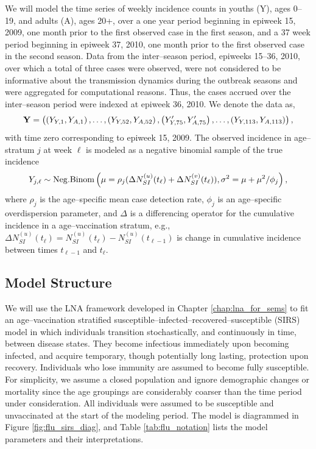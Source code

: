 We will model the time series of weekly incidence counts in youths (Y), ages 0--19, and adults (A), ages 20+, over a one year period beginning in epiweek 15, 2009, one month prior to the first observed case in the first season, and a 37 week period beginning in epiweek 37, 2010, one month prior to the first observed case in the second season. Data from the inter--season period, epiweeks 15--36, 2010, over which a total of three cases were observed, were not considered to be informative about the transmission dynamics during the outbreak seasons and were aggregated for computational reasons. Thus, the cases accrued over the inter--season period were indexed at epiweek 36, 2010. We denote the data as, $$ \mathbf{Y} = \left (\left (Y_{Y,1},Y_{A,1}\right ),\dots,\left (Y_{Y,52},Y_{A,52}\right ),\left (Y^\prime_{Y,75},Y^\prime_{A,75}\right ),\dots,\left (Y_{Y,113},Y_{A,113}\right )\right ), $$ with time zero corresponding to epiweek 15, 2009. The observed incidence in age--stratum $ j $ at week $ \ell $ is modeled as a negative binomial sample of the true incidence \begin{equation}
\label{flu_emit_prob}
Y_{j,\ell} \sim \mathrm{Neg.Binom}\left (\mu = \rho_j(\Delta N_{SI}^{(u)}(t_\ell) + \Delta N_{SI}^{(v)}(t_\ell)), \sigma^2 = \mu + \mu^2 / \phi_j\right ),
\end{equation}
where $ \rho_j $ is the age--specific mean case detection rate, $ \phi_j $ is an age--specific overdispersion parameter, and $ \Delta $ is a differencing operator for the cumulative incidence in a age--vaccination stratum, e.g., $ \Delta N_{SI}^{(u)}(t_\ell) = N_{SI}^{(u)}(t_\ell) - N_{SI}^{(u)}(t_{\ell-1}) $ is change in cumulative incidence between times $ t_{\ell-1} $ and $ t_\ell $.

\subsection{Model Structure}
\label{subsec:flu_modstructure}

We will use the LNA framework developed in Chapter \ref{chap:lna_for_sems} to fit an age--vaccination stratified susceptible--infected--recovered--susceptible (SIRS) model in which individuals transition stochastically, and continuously in time, between disease states. They become infectious immediately upon becoming infected, and acquire temporary, though potentially long lasting, protection upon recovery. Individuals who lose immunity are assumed to become fully susceptible. For simplicity, we assume a closed population and ignore demographic changes or mortality since the age groupings are considerably coarser than the time period under consideration. All individuals were assumed to be susceptible and unvaccinated at the start of the modeling period. The model is diagrammed in Figure \ref{fig:flu_sirs_diag}, and Table \ref{tab:flu_notation} lists the model parameters and their interpretations. 

